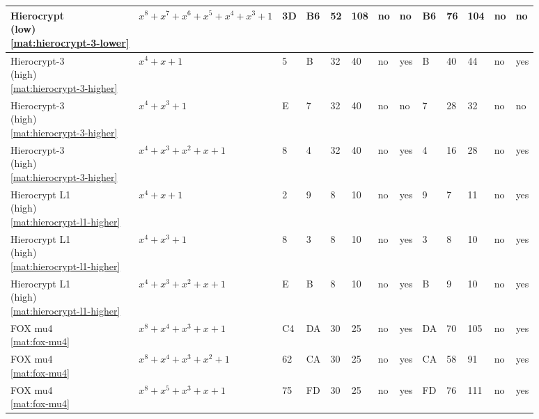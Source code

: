 \begin{tiny}
\begin{longtable}{|l|l|l|l|l|l|l|l|l|l|l|l|l|}
\shortstack{Hierocrypt \\ (low) \\ \eqref{mat:hierocrypt-3-lower}} & $x^8 + x^7 + x^6 + x^5 + x^4 + x^3 + 1$ & 3D & B6 & 52 & 108 & no & no & B6 & 76 & 104 & no & no \\ \hline
\shortstack{Hierocrypt-3 \\ (high) \\ \eqref{mat:hierocrypt-3-higher}} & $x^4 + x + 1$ & 5 & B & 32 & 40 & no & yes & B & 40 & 44 & no & yes \\ \hline
\shortstack{Hierocrypt-3 \\ (high) \\ \eqref{mat:hierocrypt-3-higher}} & $x^4 + x^3 + 1$ & E & 7 & 32 & 40 & no & no & 7 & 28 & 32 & no & no \\ \hline
\shortstack{Hierocrypt-3 \\ (high) \\ \eqref{mat:hierocrypt-3-higher}} & $x^4 + x^3 + x^2 + x + 1$ & 8 & 4 & 32 & 40 & no & yes & 4 & 16 & 28 & no & yes \\ \hline
\shortstack{Hierocrypt L1 \\ (high) \\ \eqref{mat:hierocrypt-l1-higher}} & $x^4 + x + 1$ & 2 & 9 & 8 & 10 & no & yes & 9 & 7 & 11 & no & yes \\ \hline
\shortstack{Hierocrypt L1 \\ (high) \\ \eqref{mat:hierocrypt-l1-higher}} & $x^4 + x^3 + 1$ & 8 & 3 & 8 & 10 & no & yes & 3 & 8 & 10 & no & yes \\ \hline
\shortstack{Hierocrypt L1 \\ (high) \\ \eqref{mat:hierocrypt-l1-higher}} & $x^4 + x^3 + x^2 + x + 1$ & E & B & 8 & 10 & no & yes & B & 9 & 10 & no & yes \\ \hline
\shortstack{FOX mu4 \\ \eqref{mat:fox-mu4}} & $x^8 + x^4 + x^3 + x + 1$ & C4 & DA & 30 & 25 & no & yes & DA & 70 & 105 & no & yes \\ \hline
\shortstack{FOX mu4 \\ \eqref{mat:fox-mu4}} & $x^8 + x^4 + x^3 + x^2 + 1$ & 62 & CA & 30 & 25 & no & yes & CA & 58 & 91 & no & yes \\ \hline
\shortstack{FOX mu4 \\ \eqref{mat:fox-mu4}} & $x^8 + x^5 + x^3 + x + 1$ & 75 & FD & 30 & 25 & no & yes & FD & 76 & 111 & no & yes \\ \hline

\end{longtable}
\end{tiny}
